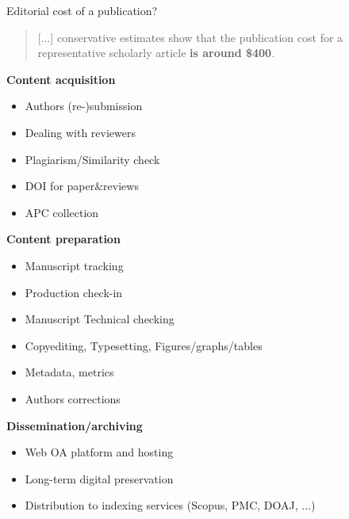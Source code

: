 \documentclass[10pt,compress,serif,aspectratio=169]{beamer}
\begin{document}

\begin{frame}[t]{Editorial cost of a publication?}
\begin{quote}
  \vspace{-.2cm}
   [...] conservative estimates show that the publication cost for a representative scholarly article \textbf{is around \$400}.
 \end{quote}

  \begin{minipage}{.45\textwidth}
   \textbf{Content acquisition}
   \begin{itemize}
   \item Authors (re-)submission
   \item Dealing with reviewers
   \item Plagiarism/Similarity check
   \item DOI for paper\&reviews
   \item APC collection
   \end{itemize}
 \end{minipage}
 \hfill
   \pause
 \begin{minipage}{.45\textwidth}
   \textbf{Content preparation}
   \begin{itemize}
   \item Manuscript tracking
   \item Production check-in
   \item Manuscript Technical checking
   \item Copyediting, Typesetting, Figures/graphs/tables
   \item Metadata, metrics
   \item Authors corrections
   \end{itemize}
\end{minipage}
\vfill
\pause
\begin{center}
 \begin{minipage}{.7\textwidth}
  \textbf{Dissemination/archiving}
  \begin{itemize}
  \item Web OA platform and hosting
  \item Long-term digital preservation
  \item Distribution to indexing services (Scopus, PMC, DOAJ, ...)
  \end{itemize}
\end{minipage}
\end{center}
\end{frame}
\end{document}
